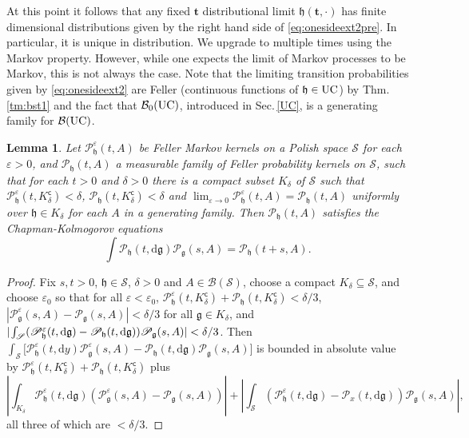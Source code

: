 \documentclass[letterpaper,reqno,11pt,oneside,final]{amsart}
\newcommand{\funnyp}{\mathscr{P}}
\newtheorem{lem}[thm]{Lemma}
\theoremstyle{definition}
\newcommand{\fh}{\mathfrak{h}}
\newcommand{\fg}{\mathfrak{g}}
\newcommand{\ep}{\varepsilon}
\newcommand{\tsm}{\hspace{-0.1em}}
\newcommand{\uptext}[1]{\text{\upshape{#1}}}
\DeclareMathOperator{\UC}{\uptext{UC}}
\renewcommand{\d}{\mathrm{d}}
\newcommand{\ft}{\mathbf{t}}
\numberwithin{equation}{section}
\begin{document}
At this point it follows that any fixed $\ft$ distributional limit $\fh(\ft,\cdot)$ has 
finite dimensional distributions given by the right hand side of \eqref{eq:onesideext2pre}.  In particular, it is unique in distribution.  We upgrade to multiple times using the Markov property. However, while one expects the limit of Markov processes to be Markov, this is not always the case.
Note that the limiting transition probabilities given by \eqref{eq:onesideext2} are Feller (continuous functions of $\fh\in\UC$) by Thm.\,\ref{tm:bst1} and the fact that $\mathcal{B}_0(\UC)$, introduced in Sec.\,\ref{UC}, is a generating family for $\mathcal{B}(\UC)$. 

\begin{lem}\label{lem:MP} 
Let $\funnyp^\ep_\fh(t,A)$ be Feller Markov kernels on a Polish space $\mathscr{S}$ for each $\ep>0$, and $\funnyp_\fh(t,A)$ a measurable family of Feller probability kernels on $\mathscr{S}$, such that for each $t>0$ and $\delta>0$ there is a compact subset $K_\delta$ of $\mathscr{S}$ such that $\funnyp^\ep_\fh(t,K_\delta^\mathsf{c})<\delta$, $\funnyp_\fh(t,K_\delta^\mathsf{c})<\delta$ and  $\lim_{\ep\to 0} \funnyp^\ep_\fh(t,A)= \funnyp_\fh(t,A)$ uniformly over $\fh\in K_\delta$ for each $A$ in a generating family.
Then $\funnyp_\fh(t,A)$ satisfies the Chapman-Kolmogorov equations 
\begin{equation} \int \funnyp_\fh(t,\d\fg) \funnyp_\fg(s,A) = \funnyp_\fh(t+s,A).
\label{CKeqns}\end{equation}
\end{lem}

\begin{proof}
   Fix $s,t>0$, $\fh\in \mathscr{S}$, $\delta>0$ and $A\in\mathcal{B}(\mathscr{S})$, choose a compact $K_\delta\subseteq \mathscr{S}$, and choose $\ep_0$ so that for all $\ep<\ep_0$,  $\funnyp^\ep_\fh(t,K^\mathsf{c}_\delta) + \funnyp_\fh(t,K^\mathsf{c}_\delta)<\delta/3$, $|\funnyp^\ep_\fg(s,A) - \funnyp_\fg(s,A)|  <\delta/3$ for all $\fg\in K_\delta$, and $|\tsm\int_{\mathscr{S}} ( \funnyp^\ep_\fh(t,\d\fg) -\funnyp_\fh(t,\d\fg))   \funnyp_\fg(s,A)|<\delta/3$.
   Then $\int_{\mathscr{S}}\big[\funnyp^\ep_\fh(t,\d y) \funnyp^\ep_\fg(s,A) -  \funnyp_\fh(t,\d\fg) \funnyp_\fg(s,A)\big]$ is bounded in absolute value by $\funnyp^\ep_\fh(t,K^\mathsf{c}_\delta) + \funnyp_\fh(t,K^\mathsf{c}_\delta) $ plus  
  \begin{equation}
 	\left|\int_{K_\delta}  \funnyp^\ep_\fh(t,\d\fg) ( \funnyp^\ep_\fg(s,A) -  \funnyp_\fg(s,A) )\right|  + \left|\int_{\mathscr{S}} (\funnyp^\ep_\fh(t,\d\fg) -\funnyp_x(t,\d\fg))  \funnyp_\fg(s,A) \right|,
  \end{equation} 
  all three of which are $<\delta/3$.
\end{proof}
\end{document}

